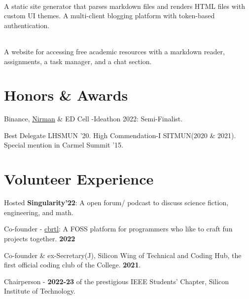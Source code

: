 \documentclass[]{assets/deedy-resume-openfont}
\begin{document}
\hfill {}\\
A static site generator that parses markdown files and renders HTML files with custom UI themes. A multi-client blogging platform with token-based authentication. \\
\sectionsep


\hfill {}\\
A website for accessing free academic resources with a markdown reader, assignments, a task manager, and a chat section.\\

\sectionsep
%
%
\section{Honors \& Awards}
\begin{tightemize}  
\item Binance, \href{https://nirmansilicon.tech/}{\underline{Nirman}} \& ED Cell -Ideathon 2022: Semi-Finalist.\\
\item Best Delegate LHSMUN '20. High Commendation-I SITMUN(2020 \& 2021). Special mention in Carmel Summit '15. \\
\end{tightemize}
\section{Volunteer Experience}
\begin{tightemize}  
\item Hosted  \textbf{Singularity'22}: A open forum/ podcast to discuss science fiction, engineering, and math. \\ 
\item Co-founder - \underline{\href{https://cbrtl.github.io}{cbrtl}}: A FOSS platform for programmers who like to craft fun projects together. \textbf{2022}\\
\item Co-founder \& ex-Secretary(J), Silicon Wing of Technical and Coding Hub, the first official coding club of the College. \textbf{2021}.\\
\item Chairperson - \textbf{2022-23} of the prestigious IEEE Students’ Chapter, Silicon Institute of Technology.\\
\end{tightemize}
\ 
\end{document}
